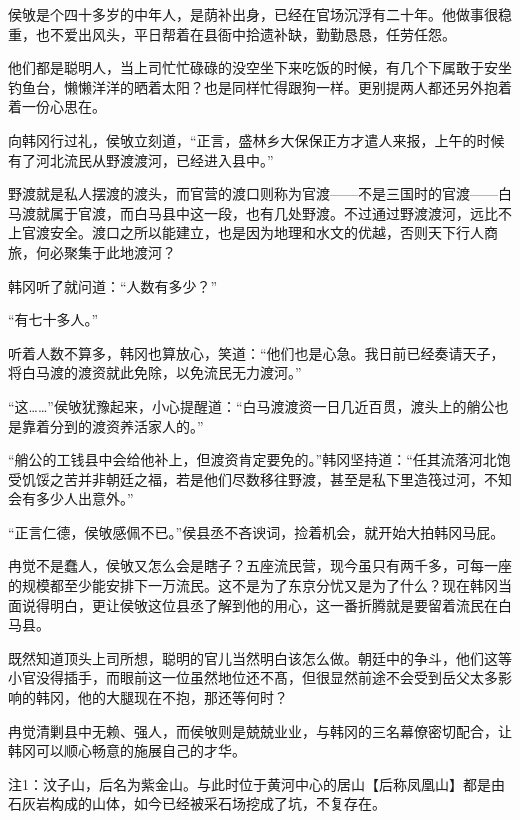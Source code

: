 侯敂是个四十多岁的中年人，是荫补出身，已经在官场沉浮有二十年。他做事很稳重，也不爱出风头，平日帮着在县衙中拾遗补缺，勤勤恳恳，任劳任怨。

他们都是聪明人，当上司忙忙碌碌的没空坐下来吃饭的时候，有几个下属敢于安坐钓鱼台，懒懒洋洋的晒着太阳？也是同样忙得跟狗一样。更别提两人都还另外抱着着一份心思在。

向韩冈行过礼，侯敂立刻道，“正言，盛林乡大保保正方才遣人来报，上午的时候有了河北流民从野渡渡河，已经进入县中。”

野渡就是私人摆渡的渡头，而官营的渡口则称为官渡——不是三国时的官渡——白马渡就属于官渡，而白马县中这一段，也有几处野渡。不过通过野渡渡河，远比不上官渡安全。渡口之所以能建立，也是因为地理和水文的优越，否则天下行人商旅，何必聚集于此地渡河？

韩冈听了就问道：“人数有多少？”

“有七十多人。”

听着人数不算多，韩冈也算放心，笑道：“他们也是心急。我日前已经奏请天子，将白马渡的渡资就此免除，以免流民无力渡河。”

“这……”侯敂犹豫起来，小心提醒道：“白马渡渡资一日几近百贯，渡头上的艄公也是靠着分到的渡资养活家人的。”

“艄公的工钱县中会给他补上，但渡资肯定要免的。”韩冈坚持道：“任其流落河北饱受饥馁之苦并非朝廷之福，若是他们尽数移往野渡，甚至是私下里造筏过河，不知会有多少人出意外。”

“正言仁德，侯敂感佩不已。”侯县丞不吝谀词，捡着机会，就开始大拍韩冈马屁。

冉觉不是蠢人，侯敂又怎么会是瞎子？五座流民营，现今虽只有两千多，可每一座的规模都至少能安排下一万流民。这不是为了东京分忧又是为了什么？现在韩冈当面说得明白，更让侯敂这位县丞了解到他的用心，这一番折腾就是要留着流民在白马县。

既然知道顶头上司所想，聪明的官儿当然明白该怎么做。朝廷中的争斗，他们这等小官没得插手，而眼前这一位虽然地位还不髙，但很显然前途不会受到岳父太多影响的韩冈，他的大腿现在不抱，那还等何时？

冉觉清剿县中无赖、强人，而侯敂则是兢兢业业，与韩冈的三名幕僚密切配合，让韩冈可以顺心畅意的施展自己的才华。

注1：汶子山，后名为紫金山。与此时位于黄河中心的居山【后称凤凰山】都是由石灰岩构成的山体，如今已经被采石场挖成了坑，不复存在。


